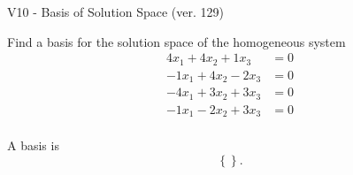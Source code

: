 \begin{exercise}
  \begin{exerciseTitle}V10 - Basis of Solution Space (ver. 129)\end{exerciseTitle}
  \begin{exerciseStatement}
    Find a basis for the solution space of the homogeneous system 
\begin{align*}
 4 x_ 1 + 4 x_ 2 + 1 x_ 3 &= 0  \\ 
  -1 x_ 1 + 4 x_ 2 -2 x_ 3 &= 0  \\ 
  -4 x_ 1 + 3 x_ 2 + 3 x_ 3 &= 0  \\ 
  -1 x_ 1 -2 x_ 2 + 3 x_ 3 &= 0  \\ 
 \end{align*}


 
  \end{exerciseStatement}

  \begin{exerciseAnswer}
   A basis is   
\[\left\{\right\}.\]

  


  \end{exerciseAnswer}
\end{exercise}